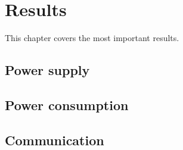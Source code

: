 \chapter{Results}
This chapter covers the most important results.

\section{Power supply}


\section{Power consumption}


\newpage
\section{Communication}
